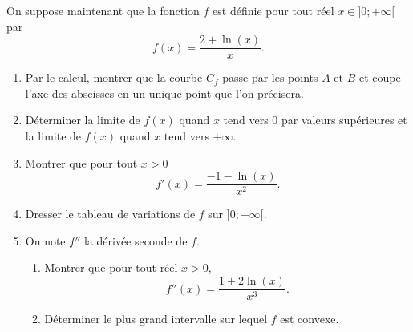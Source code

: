 \documentclass[11pt,fleqn, openany]{book} %
\begin{document}
\begin{exercise}[subtitle={(Sujet zéro 2021)}]
On suppose maintenant que la fonction $f$ est définie pour tout réel $x \in ]0;+\infty[$ par
\[f(x)=\dfrac{2+\ln(x)}{x}.\]
\begin{enumerate}
\item Par le calcul, montrer que la courbe $C_f$ passe par les points $A$ et $B$ et coupe l'axe des abscisses en un unique point que l'on précisera.
\item Déterminer la limite de $f(x)$ quand $x$ tend vers 0 par valeurs supérieures et la limite de $f(x)$ quand $x$ tend vers $+\infty$.
\item Montrer que pour tout $x>0$
\[f'(x)=\dfrac{-1-\ln(x)}{x^2}.\]
\item Dresser le tableau de variations de $f$ sur $]0;+\infty [$.
\item On note $f''$ la dérivée seconde de $f$. 
\begin{enumerate}
\item Montrer que pour tout réel $x>0$,
\[f''(x)=\dfrac{1+2\ln(x)}{x^3}.\]
\item Déterminer le plus grand intervalle sur lequel $f$ est convexe.
\end{enumerate}
\end{enumerate}

\end{exercise}
\end{document}
